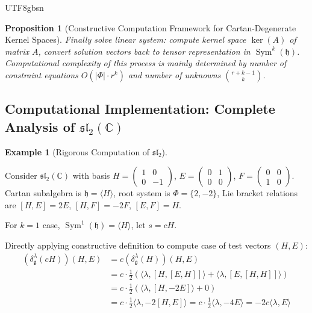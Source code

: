 \documentclass[a4paper,12pt]{extarticle}
\newtheorem{proposition}[theorem]{Proposition}
\theoremstyle{definition}
\newtheorem{example}{Example}[section]
\begin{document}
\begin{CJK}{UTF8}{gbsn}
\begin{proposition}[Constructive Computation Framework for Cartan-Degenerate Kernel Spaces]
Finally solve linear system: compute kernel space $\ker(A)$ of matrix $A$, convert solution vectors back to tensor representation in $\operatorname{Sym}^k(\mathfrak{h})$. Computational complexity of this process is mainly determined by number of constraint equations $O(|\Phi| \cdot r^k)$ and number of unknowns $\binom{r+k-1}{k}$.
\end{proposition}

\subsection{Computational Implementation: Complete Analysis of $\mathfrak{sl}_2(\mathbb{C})$}
\label{subsec:sl2_complete_analysis}

\begin{example}[Rigorous Computation of $\mathfrak{sl}_2$]
\label{ex:sl2_rigorous_computation}

Consider $\mathfrak{sl}_2(\mathbb{C})$ with basis $H = \begin{pmatrix} 1 & 0 \\ 0 & -1 \end{pmatrix}$, $E = \begin{pmatrix} 0 & 1 \\ 0 & 0 \end{pmatrix}$, $F = \begin{pmatrix} 0 & 0 \\ 1 & 0 \end{pmatrix}$. Cartan subalgebra is $\mathfrak{h} = \langle H \rangle$, root system is $\Phi = \{2, -2\}$, Lie bracket relations are $[H, E] = 2E$, $[H, F] = -2F$, $[E, F] = H$.

For $k = 1$ case, $\operatorname{Sym}^1(\mathfrak{h}) = \langle H \rangle$, let $s = cH$.

Directly applying constructive definition to compute case of test vectors $(H, E)$:
\begin{align}
(\delta^\lambda_\mathfrak{g}(cH))(H, E) &= c(\delta^\lambda_\mathfrak{g}(H))(H, E) \\
&= c \cdot \frac{1}{2} \left( \langle \lambda, [H, [E, H]] \rangle + \langle \lambda, [E, [H, H]] \rangle \right) \\
&= c \cdot \frac{1}{2} \left( \langle \lambda, [H, -2E] \rangle + 0 \right) \\
&= c \cdot \frac{1}{2} \langle \lambda, -2[H, E] \rangle = c \cdot \frac{1}{2} \langle \lambda, -4E \rangle = -2c \langle \lambda, E \rangle
\end{align}


\end{example}
\end{CJK}
\end{document}
